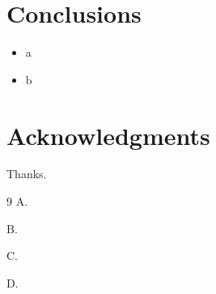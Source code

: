 \documentclass{article}
\begin{document}
\section{Conclusions}
\begin{itemize}\item a \itemize \item b \end{itemize}
\section*{Acknowledgments}
Thanks.
\begin{thebibliography}{9}
 A.

 B.

 C.

 D.
\end{thebibliography}
\end{document}
